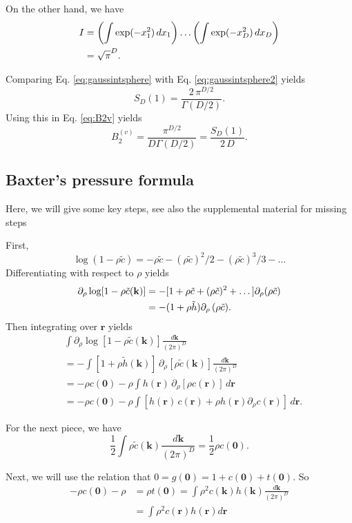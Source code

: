 \documentclass[aip,jcp,reprint,superscriptaddress]{revtex4-1}
\numberwithin{equation}{subsection}
\newcommand{\vct}[1]{\mathbf{#1}}
\providecommand{\vr}{} %
\renewcommand{\vr}{\vct{r}}
\newcommand{\vk}{\vct{k}}
\newcommand{\dvk}{\frac{d\vk}{(2\pi)^D}}
\begin{document}
On the other hand, we have
\begin{align}
  I
  &=
\left( \int \exp(-x_1^2) \, d x_1 \right)
\dots
\left( \int \exp(-x_D^2) \, d x_D \right) \notag \\
&= \sqrt\pi^D.
\label{eq:gaussintsphere2}
\end{align}

Comparing Eq. \eqref{eq:gaussintsphere} with Eq. \eqref{eq:gaussintsphere2}
yields
\begin{equation}
  S_D(1) = \frac{ 2 \, \pi^{D/2} } { \Gamma(D/2) }.
  \label{eq:surfareaD}
\end{equation}
Using this in Eq. \eqref{eq:B2v} yields
\[
  B_2^{(v)}
=
\frac{ \pi^{D/2} } { D \Gamma(D/2) }
=
\frac{ S_D(1) } { 2 \, D }.
\]



\subsection{Baxter's pressure formula}

Here, we will give some key steps, see also the supplemental material
for missing steps

First,
\[
\log(1 - \rho \tilde{c})
=
-\rho \tilde{c}
-(\rho \tilde{c})^2/2
-(\rho \tilde{c})^3/3
-\dots
\]
Differentiating with respect to $\rho$ yields
\begin{align*}
\partial_\rho \log[1 - \rho \tilde{c}(\vk)]
&=
-[1
  + \rho \tilde{c}
  + (\rho \tilde{c})^2
  + \dots
  ] \partial_\rho (\rho \tilde c)
  \notag \\
&=
-(1 + \rho \tilde h) \partial_\rho \, (\rho \tilde c).
\end{align*}
%
Then integrating over $\vr$ yields
\begin{align*}
  & \int \partial_\rho \log[1 - \rho \tilde{c}(\vk)] \dvk \\
  &= -\int [1 + \rho \tilde{h}(\vk)] \, \partial_\rho [\rho \tilde{c}(\vk)] \dvk \\
  &= -\rho c(\vct 0)
  - \rho \int h(\vr) \, \partial_\rho [\rho c(\vr)] \, d\vr \\
  &= -\rho c(\vct 0)
  - \rho \int
  [h(\vr) \, c(\vr) + \rho h(\vr) \partial_\rho c(\vr)] \, d\vr.
\end{align*}
%


For the next piece, we have
\[
  \frac{1}{2} \int \rho \tilde{c}(\vk) \dvk = \frac{1}{2} \rho c(\vct{0}).
\]

Next, we will use the relation that
$0 = g(\vct0) = 1 + c(\vct0) + t(\vct0)$.
So
\begin{align*}
   -\rho c(\vct{0}) - \rho
  &= \rho t(\vct{0})
  = \int \rho^2 c(\vk) h(\vk) \dvk \\
  &= \int \rho^2 c(\vr) h(\vr) d\vr
\end{align*}
\end{document}
